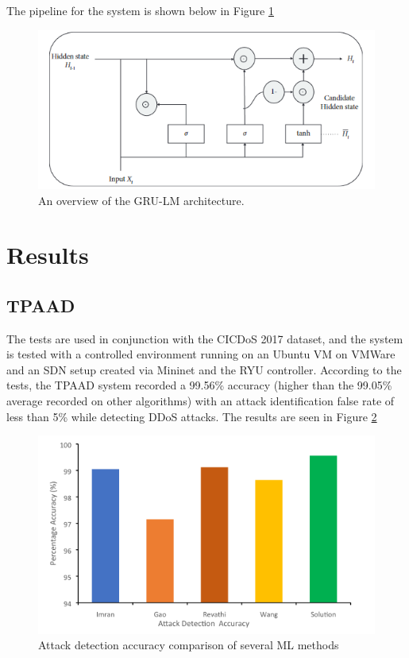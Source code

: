 \documentclass[a4paper, 12pt]{article}
\begin{document}
The pipeline for the system is shown below in Figure \ref{fig:grus}


\begin{figure}[H]
    \centering
    \includegraphics[width=0.75\linewidth]{grus.png}
    \caption{An overview of the GRU-LM architecture. \protect{}}
    \label{fig:grus}
\end{figure}

\clearpage

\section{Results}

\subsection{TPAAD} 
The tests are used in conjunction with the CICDoS 2017 dataset, and the system is tested with a controlled environment running on an Ubuntu VM on VMWare and an SDN setup created via Mininet and the RYU controller. According to the tests, the TPAAD system recorded a 99.56\% accuracy (higher than the 99.05\% average recorded on other algorithms) with an attack identification false rate of less than 5\% while detecting DDoS attacks. The results are seen in Figure \ref{fig:4} 

\begin{figure}[H]
    \centering
    \includegraphics[width=0.7\linewidth]{image.png}
    \caption{Attack detection accuracy comparison of several ML methods \protect{}}
    \label{fig:4}
\end{figure}
\end{document}
